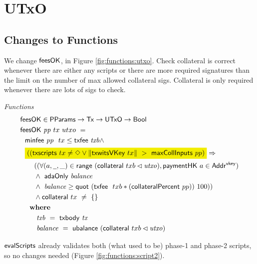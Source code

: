\section{UTxO}
\label{sec:utxo}


\subsection{Changes to Functions}

We change $\mathsf{feesOK}$, in Figure \ref{fig:functions:utxo}.
Check collateral is correct whenever there are either any scripts or there are more
required signatures than the limit on the number of max allowed collateral sigs.
Collateral is only required whenever there are lots of sigs to check.

\begin{figure*}[htb]
  \emph{Functions}
  \begin{align*}
    & \fun{feesOK} \in \PParams \to \Tx \to \UTxO \to \Bool  \\
    & \fun{feesOK}~\var{pp}~tx~utxo~= \\
    &~~      \minfee{pp}~{tx} \leq \txfee{txb} \wedge \\
    &~~ \hldiff{((\fun{txscripts}~tx \neq \Nothing \vee \|\fun{txwitsVKey}~{tx}\| ~>~ \fun{maxCollInputs}~{pp})} \Rightarrow \\
    &~~~~~~((\forall (a, \wcard, \_) \in \fun{range}~(\fun{collateral}~{txb} \restrictdom \var{utxo}), \fun{paymentHK}~a \in \AddrVKey) \\
    &~~~~~~\wedge~ \fun{adaOnly}~\var{balance} \\
    &~~~~~~\wedge~ \var{balance} \geq \fun{quot}~(\txfee~{txb} * (\fun{collateralPercent}~pp))~100)) \\
    &~~~~~~\wedge \fun{collateral}~{tx}~ \neq~\{\} \\
    &~~      \where \\
    & ~~~~~~~ \var{txb}~=~\txbody{tx} \\
    & ~~~~~~~ \var{balance}~=~\fun{ubalance}~(\fun{collateral}~{txb} \restrictdom \var{utxo})
  \end{align*}
  \caption{Functions related to fees and collateral}
  \label{fig:functions:utxo}
\end{figure*}

$\mathsf{evalScripts}$ already validates both (what used to be) phase-1 and phase-2 scripts, so
no changes needed (Figure \ref{fig:functions:script2}).

